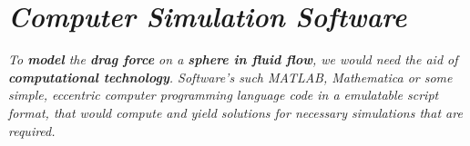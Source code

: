             
            
            
            
            
            
            
            
            
            
            
\section{\textit{Computer Simulation Software}}
        
    \textit{To \textbf{model} the \textbf{drag force} on a \textbf{sphere in fluid flow}, we would need the aid of \textbf{computational technology}. Software's such MATLAB, Mathematica or some simple, eccentric computer programming language code in a emulatable script format, that would compute and yield solutions for necessary simulations that are required.}
    
        
        


